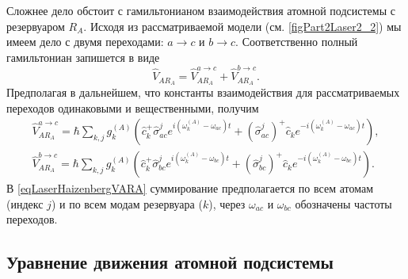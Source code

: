 Сложнее дело обстоит с гамильтонианом взаимодействия атомной
подсистемы с резервуаром $R_A$. Исходя из рассматриваемой модели
(см. \autoref{figPart2Laser2_2}) мы имеем дело с двумя переходами:
$a \rightarrow c$ и $b \rightarrow c$. Соответственно полный
гамильтониан запишется в виде
\begin{equation}
\hat{V}_{AR_A} = \hat{V}_{AR_A}^{a \rightarrow c} + \hat{V}_{AR_A}^{b \rightarrow c}.
\nonumber
\end{equation}
Предполагая в дальнейшем, что константы взаимодействия для
рассматриваемых переходов одинаковыми и вещественными, получим
\begin{eqnarray}
\hat{V}_{AR_A}^{a \rightarrow c} = \hbar \sum_{k,j} 
g_k^{(A)}
 \left(
\hat{c}_k^{+}\hat{\sigma}_{ac}^{j} e^{i\left(\omega_k^{(A)} - \omega_{ac}\right)t} +
\left(\hat{\sigma}_{ac}^{j}\right)^{+}\hat{c}_k e^{-i\left(\omega_k^{(A)} - \omega_{ac}\right)t}
\right),
\nonumber \\
\hat{V}_{AR_A}^{b \rightarrow c} = \hbar \sum_{k,j} 
g_k^{(A)}
 \left(
\hat{c}_k^{+}\hat{\sigma}_{bc}^{j} e^{i\left(\omega_k^{(A)} - \omega_{bc}\right)t} +
\left(\hat{\sigma}_{bc}^{j}\right)^{+}\hat{c}_k e^{-i\left(\omega_k^{(A)} - \omega_{bc}\right)t}
\right).
\label{eqLaserHaizenbergVARA}
\end{eqnarray}
В \eqref{eqLaserHaizenbergVARA} суммирование предполагается по всем
атомам (индекс $j$) и по всем модам резервуара ($k$), через
$\omega_{ac}$ и $\omega_{bc}$ обозначены частоты переходов.

\subsection{Уравнение движения атомной подсистемы}

